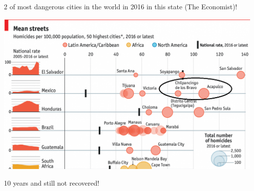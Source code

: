 \documentclass[xcolor={dvipsnames}]{beamer}
\begin{document}
\begin{frame}

\Large{
2 of most dangerous cities in the world in 2016 in this state (The Economist)!

				\begin{center}
		\includegraphics[scale=.38]{Figures/Capture}
				\end{center}				

}
\end{frame}

\begin{frame}

\Large{
10 years and still not recovered!

							\begin{center}		
				\end{center}
				

}
\end{frame}






\end{document}
